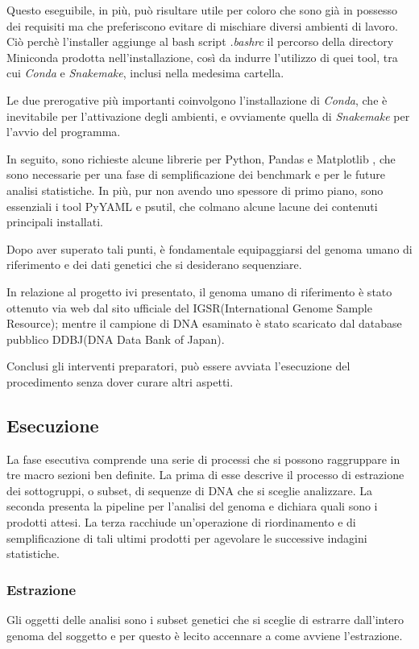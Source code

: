 Questo eseguibile, in più, può risultare utile per coloro che sono già in possesso dei requisiti ma che preferiscono evitare di mischiare diversi ambienti di lavoro.
Ciò perchè l'installer aggiunge al bash script \textit{.bashrc} il percorso della directory Miniconda prodotta nell'installazione, così da indurre l'utilizzo di quei tool, tra cui \textit{Conda} e \textit{Snakemake}, inclusi nella medesima cartella.


Le due prerogative più importanti coinvolgono l'installazione di \textit{Conda}, che è inevitabile per l'attivazione degli ambienti, e ovviamente quella di \textit{Snakemake} per l'avvio del programma.


In seguito, sono richieste alcune librerie per Python, Pandas \cite{pandas} e Matplotlib \cite{Matplotlib}, che sono necessarie per una fase di semplificazione dei benchmark e per le future analisi statistiche.
In più, pur non avendo uno spessore di primo piano, sono essenziali i tool PyYAML e psutil, che colmano alcune lacune dei contenuti principali installati.


Dopo aver superato tali punti, è fondamentale equipaggiarsi del genoma umano di riferimento e dei dati genetici che si desiderano sequenziare.


In relazione al progetto ivi presentato, il genoma umano di riferimento è stato ottenuto via web dal sito ufficiale del IGSR(International Genome Sample Resource); mentre il campione di DNA esaminato è stato scaricato dal database pubblico DDBJ(DNA Data Bank of Japan).


Conclusi gli interventi preparatori, può essere avviata l'esecuzione del procedimento senza dover curare altri aspetti.


\subsection{Esecuzione}
La fase esecutiva comprende una serie di processi che si possono raggruppare in tre macro sezioni ben definite.
La prima di esse descrive il processo di estrazione dei sottogruppi, o subset, di sequenze di DNA che si sceglie analizzare.
La seconda presenta la pipeline per l'analisi del genoma e dichiara quali sono i prodotti attesi.
La terza racchiude un'operazione di riordinamento e di semplificazione di tali ultimi prodotti per agevolare le successive indagini statistiche.



\subsubsection{Estrazione}
\label{subsubsec: ext}
Gli oggetti delle analisi sono i subset genetici che si sceglie di estrarre dall'intero genoma del soggetto e per questo è lecito accennare a come avviene l'estrazione.

